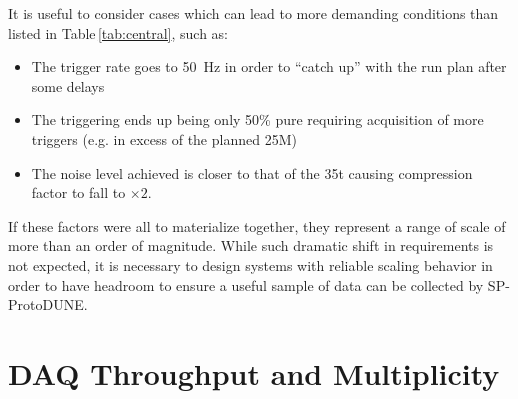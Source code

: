 \documentclass[pdftex,12pt,letter]{article}
\newcommand{\pd}{ProtoDUNE\xspace}
\begin{document}
It is useful to consider cases which can lead to more demanding conditions than listed in Table\,\ref{tab:central},
such as:
\begin{itemize}

\item The trigger rate goes to \SI{50}{\Hz} in order to ``catch up'' with the run plan after some delays

\item The triggering ends up being only 50\% pure requiring acquisition of more triggers (e.g. in excess of the planned 25M)

\item The noise level achieved is closer to that of the 35t causing   compression factor to fall to $\times 2$.

\end{itemize}


\noindent If these factors were all to materialize together, they represent a range of scale
of more than an order of magnitude. While such dramatic shift in requirements is not expected,
it is necessary to design systems with reliable scaling behavior in order to have headroom
to ensure a useful sample of data can be collected by SP-\pd.



\section{DAQ Throughput and Multiplicity}
\end{document}

